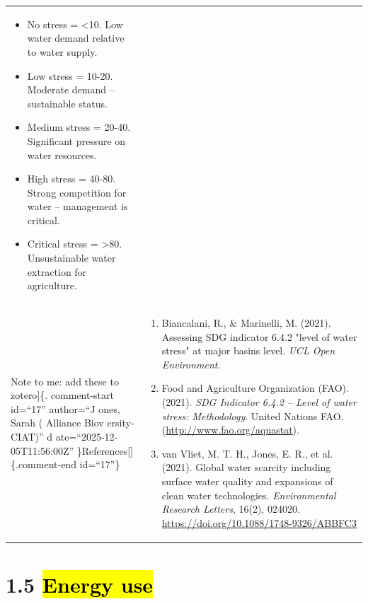 \documentclass[
  letterpaper,
  DIV=11,
  numbers=noendperiod]{scrreprt}
\begin{document}
\begin{longtable}[]{@{}
  >{\raggedright\arraybackslash}p{}
  >{\raggedright\arraybackslash}p{}@{}}
\begin{minipage}[t]{\linewidth}
\begin{itemize}
  \begin{itemize}
  \item
    No stress = \textless10. Low water demand relative to water supply.
  \item
    Low stress = 10-20. Moderate demand -- sustainable status.
  \item
    Medium stress = 20-40. Significant pressure on water resources.
  \item
    High stress = 40-80. Strong competition for water -- management is
    critical.
  \item
    Critical stress = \textgreater80. Unsustainable water extraction for
    agriculture.
  \end{itemize}
\end{itemize}
\end{minipage} \\
{[}Note to me: add these to zotero{]}\{. comment-start id=``17''
author=``J ones, Sarah ( Alliance Biov ersity-CIAT)'' d ate=``2025-12-
05T11:56:00Z'' \}References{[}{]} \{.comment-end id=``17''\} &
\begin{minipage}[t]{\linewidth}\raggedright
\begin{enumerate}
\def\labelenumi{\arabic{enumi}.}
\item
  Biancalani, R., \& Marinelli, M. (2021). Assessing SDG indicator 6.4.2
  "level of water stress" at major basins level. \emph{UCL Open
  Environment}.
\item
  Food and Agriculture Organization (FAO). (2021). \emph{SDG Indicator
  6.4.2 -- Level of water stress: Methodology}. United Nations FAO.
  (\url{http://www.fao.org/aquastat}).
\item
  van Vliet, M. T. H., Jones, E. R., et al. (2021). Global water
  scarcity including surface water quality and expansions of clean water
  technologies. \emph{Environmental Research Letters}, 16(2), 024020.
  \url{https://doi.org/10.1088/1748-9326/ABBFC3}
\end{enumerate}
\end{minipage} \\
\end{longtable}

\chapter{\texorpdfstring{1.5 \hl{Energy
use}}{1.5 Energy use}}\label{energy-use}
\end{document}
